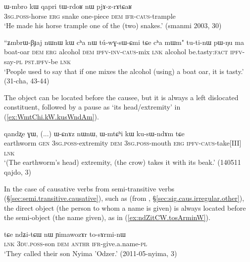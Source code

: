 \begin{exe}
\ex \label{ex:Wmbro.kW.pjAzrAtCaR}
\gll ɯ-mbro kɯ qapri tɯ-rdoʁ nɯ pjɤ-z-rɤtɕaʁ \\
\textsc{3sg}.\textsc{poss}-horse \textsc{erg} snake one-piece \textsc{dem} \textsc{ifr}-\textsc{caus}-trample \\
\glt `He made his horse trample one of the (two) snakes.' (smanmi 2003, 30)
\end{exe}

\begin{exe}
\ex \label{ex:ZmbrWBJaj.kW.tuwGsWCmi}
\gll ``ʑmbrɯ-βɟaj nɯnɯ kɯ cʰa nɯ tú-wɣ-sɯ-ɕmi tɕe cʰa mɯm" tu-ti-nɯ pɯ-ŋu ma \\
boat-oar \textsc{dem} \textsc{erg} alcohol \textsc{dem} \textsc{ipfv}-\textsc{inv}-\textsc{caus}-mix \textsc{lnk} alcohol be.tasty:\textsc{fact} \textsc{ipfv}-say-\textsc{pl} \textsc{pst}.\textsc{ipfv}-be \textsc{lnk} \\
\glt `People used to say that if one mixes the alcohol (using) a boat oar, it is tasty.' (31-cha, 43-44)
\end{exe}

The object can be located before the causee, but it is always a left dislocated constituent, followed by a pause as  `its head/extremity' in (\ref{ex:WmtChi.kW.kusWndAm}).

\begin{exe}
\ex \label{ex:WmtChi.kW.kusWndAm}
\gll  qandʐe ɣɯ, (...) ɯ-ɕnɤz nɯnɯ, ɯ-mtɕʰi kɯ ku-sɯ-ndɤm tɕe \\
earthworm \textsc{gen} {  } \textsc{3sg}.\textsc{poss}-extremity \textsc{dem} \textsc{3sg}.\textsc{poss}-mouth \textsc{erg} \textsc{ipfv}-\textsc{caus}-take[III] \textsc{lnk} \\
\glt `(The earthworm's head) extremity, (the crow) takes it with its beak.' (140511 qajdo, 3)
\end{exe}

In the case of causative verbs from semi-transitive verbs (§\ref{sec:semi.transitive.causative}), such as  (from , §\ref{sec:sig.caus.irregular.other}),  the direct object (the person to whom a name is given) is always located before the semi-object (the name given), as in (\ref{ex:ndZitCW.tosArminW}).

\begin{exe}
\ex \label{ex:ndZitCW.tosArminW}
\gll tɕe ndʑi-tɕɯ nɯ ɲimawozɤr to-sɤrmi-nɯ \\
\textsc{lnk} \textsc{3du}.\textsc{poss}-son \textsc{dem}  \textsc{anthr} \textsc{ifr}-give.a.name-\textsc{pl} \\
\glt `They called their son Nyima 'Odzer.' (2011-05-nyima, 3)
\end{exe}

